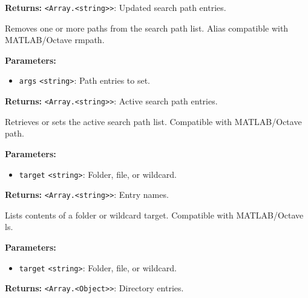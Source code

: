 \documentclass[12pt,a4paper]{article}
\begin{document}
\noindent \textbf{Returns:} \texttt{<Array.<string>>}: Updated search path entries.

\noindent Removes one or more paths from the search path list.
Alias compatible with MATLAB/Octave \textasciigrave{}rmpath\textasciigrave{}.

\vspace{5mm}
\noindent {}


\noindent \textbf{Parameters:}
\begin{itemize}
  \item \texttt{args} \texttt{<string>}: Path entries to set.
\end{itemize}

\noindent \textbf{Returns:} \texttt{<Array.<string>>}: Active search path entries.

\noindent Retrieves or sets the active search path list.
Compatible with MATLAB/Octave \textasciigrave{}path\textasciigrave{}.

\vspace{5mm}
\noindent {}


\noindent \textbf{Parameters:}
\begin{itemize}
  \item \texttt{target} \texttt{<string>}: Folder, file, or wildcard.
\end{itemize}

\noindent \textbf{Returns:} \texttt{<Array.<string>>}: Entry names.

\noindent Lists contents of a folder or wildcard target.
Compatible with MATLAB/Octave \textasciigrave{}ls\textasciigrave{}.

\vspace{5mm}
\noindent {}


\noindent \textbf{Parameters:}
\begin{itemize}
  \item \texttt{target} \texttt{<string>}: Folder, file, or wildcard.
\end{itemize}

\noindent \textbf{Returns:} \texttt{<Array.<Object>>}: Directory entries.
\end{document}
